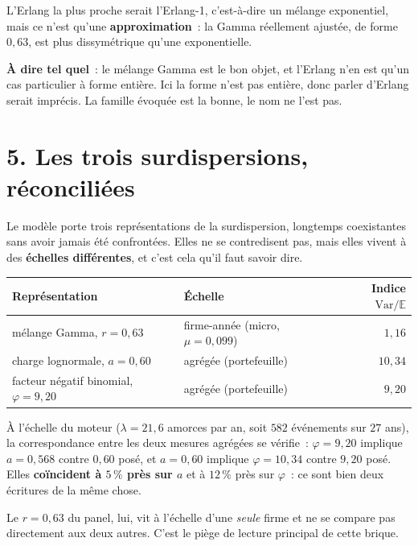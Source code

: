 \documentclass[11pt,a4paper]{article}
\begin{document}
\medskip
L'Erlang la plus proche serait l'Erlang-1, c'est-à-dire un mélange exponentiel, mais ce
n'est qu'une \textbf{approximation}~: la Gamma réellement ajustée, de forme $0{,}63$, est
plus dissymétrique qu'une exponentielle.

\medskip
\noindent\textbf{À dire tel quel}~: le mélange Gamma est le bon objet, et l'Erlang n'en est
qu'un cas particulier à forme entière. Ici la forme n'est pas entière, donc parler d'Erlang
serait imprécis. La famille évoquée est la bonne, le nom ne l'est pas.

\section*{5. Les trois surdispersions, réconciliées}

Le modèle porte trois représentations de la surdispersion, longtemps coexistantes sans
avoir jamais été confrontées. Elles ne se contredisent pas, mais elles vivent à des
\textbf{échelles différentes}, et c'est cela qu'il faut savoir dire.

\begin{center}\small
\renewcommand{\arraystretch}{1.25}
\begin{tabular}{@{}l l r@{}}
\toprule
\textbf{Représentation} & \textbf{Échelle} & \textbf{Indice $\mathrm{Var}/\mathbb{E}$} \\
\midrule
mélange Gamma, $r=0{,}63$ & firme-année (micro, $\mu=0{,}099$) & $1{,}16$ \\
charge lognormale, $a=0{,}60$ & agrégée (portefeuille) & $10{,}34$ \\
facteur négatif binomial, $\varphi=9{,}20$ & agrégée (portefeuille) & $9{,}20$ \\
\bottomrule
\end{tabular}
\end{center}

\medskip
À l'échelle du moteur ($\lambda=21{,}6$ amorces par an, soit $582$ événements sur $27$ ans),
la correspondance entre les deux mesures agrégées se vérifie~: $\varphi=9{,}20$ implique
$a=0{,}568$ contre $0{,}60$ posé, et $a=0{,}60$ implique $\varphi=10{,}34$ contre $9{,}20$
posé. Elles \textbf{coïncident à $5\,\%$ près sur $a$} et à $12\,\%$ près sur $\varphi$~: ce
sont bien deux écritures de la même chose.

Le $r=0{,}63$ du panel, lui, vit à l'échelle d'une \emph{seule} firme et ne se compare pas
directement aux deux autres. C'est le piège de lecture principal de cette brique.
\end{document}
